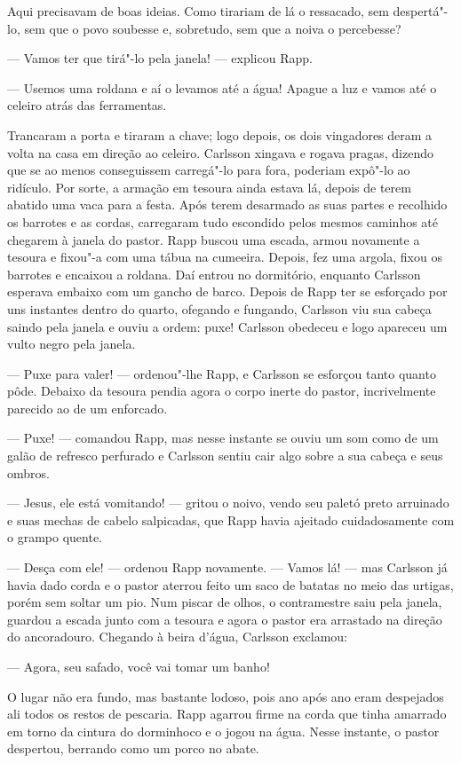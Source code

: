 Aqui precisavam de boas ideias. Como tirariam de lá o ressacado, sem 
despertá"-lo, sem que o povo soubesse e, sobretudo, sem que a noiva o percebesse?

--- Vamos ter que tirá"-lo pela janela! --- explicou Rapp.

--- Usemos uma roldana e aí o levamos até a água! Apague a luz e vamos até o
celeiro atrás das ferramentas.

Trancaram a porta e tiraram a chave; logo depois, os dois vingadores deram a
volta na casa em direção ao celeiro. Carlsson xingava e rogava pragas,
dizendo que se ao menos conseguissem carregá"-lo para fora, poderiam expô"-lo ao
ridículo. Por sorte, a armação em tesoura ainda estava lá, depois de
terem abatido uma vaca para a festa. Após terem desarmado as suas partes e
recolhido os barrotes e as cordas, carregaram tudo escondido pelos mesmos caminhos
até chegarem à janela do pastor. Rapp buscou uma escada, armou
novamente a tesoura e fixou"-a com uma tábua na cumeeira. Depois, fez
uma argola, fixou os barrotes e encaixou a roldana. Daí entrou no
dormitório, enquanto Carlsson esperava embaixo com um gancho de barco. Depois de
Rapp ter se esforçado por uns instantes dentro do quarto, ofegando e fungando,
Carlsson viu sua cabeça saindo pela janela e ouviu a ordem: puxe! Carlsson
obedeceu e logo apareceu um vulto negro pela janela.

--- Puxe para valer! --- ordenou"-lhe Rapp, e Carlsson se esforçou tanto quanto
pôde. Debaixo da tesoura pendia agora o corpo inerte do pastor, 
incrivelmente parecido ao de um enforcado.

--- Puxe! --- comandou Rapp, mas nesse instante se ouviu um som como de um galão
de refresco perfurado e Carlsson sentiu cair algo sobre a sua cabeça e seus
ombros.

--- Jesus, ele está vomitando! --- gritou o noivo, vendo seu paletó preto
arruinado e suas mechas de cabelo salpicadas, que Rapp havia ajeitado
cuidadosamente com o grampo quente.

--- Desça com ele! --- ordenou Rapp novamente. --- Vamos lá! --- mas Carlsson já havia
dado corda e o pastor aterrou feito um saco de batatas no meio das urtigas, porém sem
soltar um pio. Num piscar de olhos, o contramestre saiu pela janela,
guardou a escada junto com a tesoura e agora o pastor era arrastado na direção
do ancoradouro. Chegando à beira d'água, Carlsson exclamou:

--- Agora, seu safado, você vai tomar um banho!

O lugar não era fundo, mas bastante lodoso, pois ano após ano eram despejados ali todos os restos
de pescaria. Rapp agarrou firme na corda que tinha amarrado em torno da cintura
do dorminhoco e o jogou na água. Nesse instante, o pastor despertou, berrando 
como um porco no abate.


